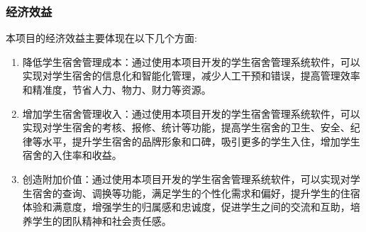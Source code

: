 \documentclass[UTF-8]{ctexart}
\begin{document}
\subsubsection{经济效益}

本项目的经济效益主要体现在以下几个方面:

\begin{enumerate}

\item 降低学生宿舍管理成本：通过使用本项目开发的学生宿舍管理系统软件，可以实现对学生宿舍的信息化和智能化管理，减少人工干预和错误，提高管理效率和精准度，节省人力、物力、财力等资源。
\item 增加学生宿舍管理收入：通过使用本项目开发的学生宿舍管理系统软件，可以实现对学生宿舍的考核、报修、统计等功能，提高学生宿舍的卫生、安全、纪律等水平，提升学生宿舍的品牌形象和口碑，吸引更多的学生入住，增加学生宿舍的入住率和收益。
\item 创造附加价值：通过使用本项目开发的学生宿舍管理系统软件，可以实现对学生宿舍的查询、调换等功能，满足学生的个性化需求和偏好，提升学生的住宿体验和满意度，增强学生的归属感和忠诚度，促进学生之间的交流和互助，培养学生的团队精神和社会责任感。

\end{enumerate}
\end{document}
